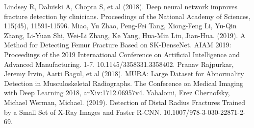 \documentclass[12pt,oneside,a4paper]{article}
\begin{document}
\clearpage
\begin{thebibliography}{99}
Lindsey  R,  Daluiski  A,  Chopra  S,  et al  (2018).  Deep  neural  network  improves fracture  detection  by  clinicians.  Proceedings  of  the  National  Academy  of Sciences, 115(45), 11591-11596.  
 Miao, Yu Zhao, Peng-Fei Tang, Xiong-Feng Li, Yu-Qin Zhang, Li-Yuan Shi, Wei-Li Zhang, Ke Yang, Hua-Min Liu, Jian-Hua. (2019). A Method for Detecting Femur Fracture Based on SK-DenseNet. AIAM 2019: Proceedings of the 2019 International Conference on Artificial Intelligence and Advanced Manufacturing. 1-7. 10.1145/3358331.3358402. 
 Pranav Rajpurkar, Jeremy Irvin, Aarti Bagul, et al (2018). MURA: Large Dataset for Abnormality Detection in Musculoskeletal Radiographs. The Conference on Medical Imaging with Deep Learning 2018, arXiv:1712.06957v4. 
 Yahalomi, Erez Chernofsky, Michael Werman, Michael. (2019). Detection of Distal Radius Fractures Trained by a Small Set of X-Ray Images and Faster R-CNN. 10.1007/978-3-030-22871-2-69. 



\end{thebibliography}
\end{document}
